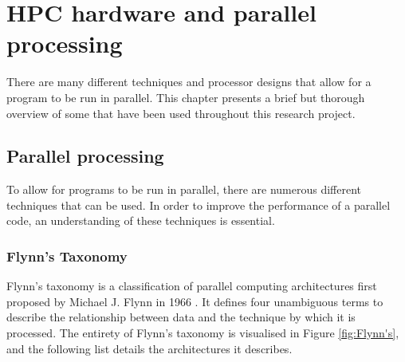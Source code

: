 \documentclass[a4paper,11pt]{report}
\begin{document}
\chapter{HPC hardware and parallel processing}
There are many different techniques and processor designs that allow for a program to be run in parallel. This chapter presents a brief but thorough overview of some that have been used throughout this research project. 

\section{Parallel processing}
To allow for programs to be run in parallel, there are numerous different techniques that can be used. In order to improve the performance of a parallel code, an understanding of these techniques is essential.

\subsection{Flynn's Taxonomy}
Flynn's taxonomy is a classification of parallel computing architectures first proposed by Michael J. Flynn in 1966 \cite{flynn1972some}. It defines four unambiguous terms to describe the relationship between data and the technique by which it is processed. The entirety of Flynn's taxonomy is visualised in Figure \ref{fig:Flynn's}, and the following list details the architectures it describes.
\end{document}
